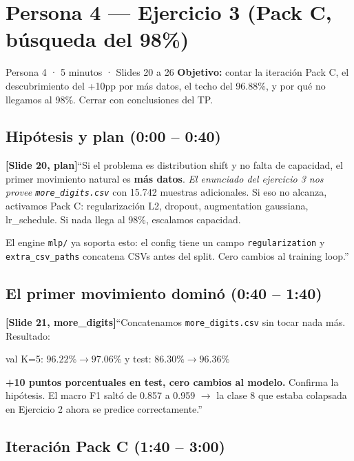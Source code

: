 \documentclass[11pt,a4paper]{article}
\newcommand{\code}[1]{\texttt{\textcolor{accent}{#1}}}
\newcommand{\slidenum}[1]{\textcolor{accent}{\textbf{[Slide #1]}}}
\newcommand{\timing}[1]{\textcolor{muted}{\small (#1)}}
\newcommand{\enunciado}[1]{\textcolor{warn}{\textit{#1}}}
\begin{document}
\section{Persona 4 — Ejercicio 3 (Pack C, búsqueda del 98\%)}\label{sec:p4}

\begin{persona}{Persona 4 · 5 minutos · Slides 20 a 26}
\textbf{Objetivo:} contar la iteración Pack C, el descubrimiento del +10pp por más datos, el techo del 96.88\%, y por qué no llegamos al 98\%. Cerrar con conclusiones del TP.
\end{persona}

\subsection{Hipótesis y plan \timing{0:00 -- 0:40}}

\slidenum{20, plan}\quad ``Si el problema es distribution shift y no falta de capacidad, el primer movimiento natural es \textbf{más datos}. \enunciado{El enunciado del ejercicio 3 nos provee \code{more\_digits.csv}} con 15.742 muestras adicionales. Si eso no alcanza, activamos Pack C: regularización L2, dropout, augmentation gaussiana, lr\_schedule. Si nada llega al 98\%, escalamos capacidad.

El engine \code{mlp/} ya soporta esto: el config tiene un campo \code{regularization} y \code{extra\_csv\_paths} concatena CSVs antes del split. Cero cambios al training loop.''

\subsection{El primer movimiento dominó \timing{0:40 -- 1:40}}

\slidenum{21, more\_digits}\quad ``Concatenamos \code{more\_digits.csv} sin tocar nada más. Resultado:

\begin{center}\large
val K=5: $96.22\% \to 97.06\%$ \quad y \quad test: $\boldsymbol{86.30\%} \to \boldsymbol{96.36\%}$
\end{center}

\textbf{+10 puntos porcentuales en test, cero cambios al modelo.} Confirma la hipótesis. El macro F1 saltó de 0.857 a 0.959 \(\to\) la clase 8 que estaba colapsada en Ejercicio 2 ahora se predice correctamente.''

\subsection{Iteración Pack C \timing{1:40 -- 3:00}}
\end{document}
